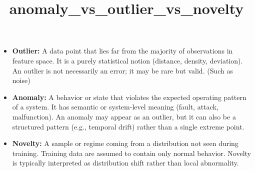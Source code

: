 \documentclass[a4paper]{article}
\title{anomaly\_vs\_outlier\_vs\_novelty}
\date{}
\begin{document}
    \maketitle
    \begin{itemize}
        \item \textbf{Outlier:}
        A data point that lies far from the majority of observations in feature space.
        It is a purely statistical notion (distance, density, deviation).
        An outlier is not necessarily an error; it may be rare but valid. (Such as noise)
        
        \item \textbf{Anomaly:}
        A behavior or state that violates the expected operating pattern of a system.
        It has semantic or system-level meaning (fault, attack, malfunction).
        An anomaly may appear as an outlier, but it can also be a structured pattern (e.g., temporal drift) rather than a single extreme point.
        
        \item \textbf{Novelty:}
        A sample or regime coming from a distribution not seen during training.
        Training data are assumed to contain only normal behavior.
        Novelty is typically interpreted as distribution shift rather than local abnormality.
    \end{itemize}
    
\end{document}
